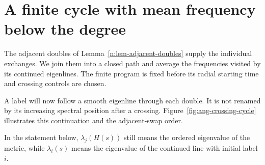 \section{A finite cycle with mean frequency below the degree}
\label{n:sec-angular-program}

The adjacent doubles of Lemma~\ref{n:lem-adjacent-doubles} supply the
individual exchanges. We join them into a closed path and average the
frequencies visited by its continued eigenlines. The finite program is
fixed before its radial starting time and crossing controls are chosen.

A label will now follow a smooth eigenline through each double.  It is
not renamed by its increasing spectral position after a crossing.
Figure~\ref{fig:ang-crossing-cycle} illustrates this continuation and
the adjacent-swap order.

In the statement below, \(\lambda_j(H(s))\) still means the ordered
eigenvalue of the metric, while \(\lambda_i(s)\) means the eigenvalue
of the continued line with initial label \(i\).

